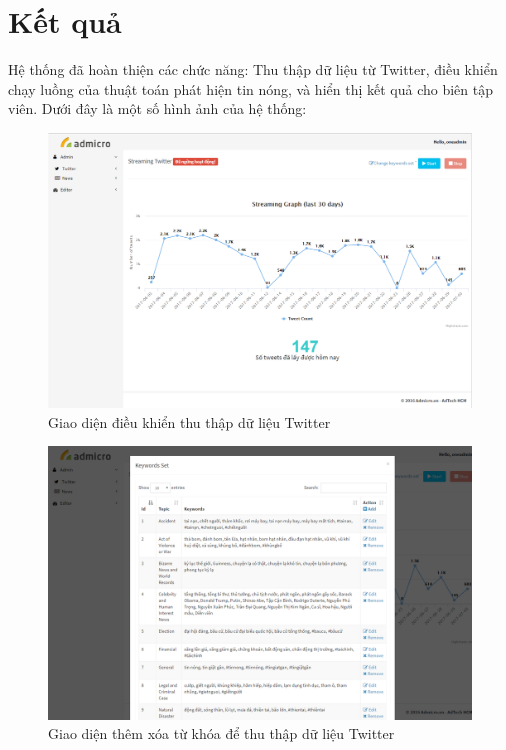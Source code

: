 \section{Kết quả}
Hệ thống đã hoàn thiện các chức năng: Thu thập dữ liệu từ Twitter, điều khiển chạy luồng của thuật toán phát hiện tin nóng, và hiển thị kết quả cho biên tập viên. Dưới đây là một số hình ảnh của hệ thống:

\begin{figure}[H]
	\centering
	\includegraphics[width=1\linewidth]{Chapter3/Chapter3Figs/StreamingNonwide}
	\caption{Giao diện điều khiển thu thập dữ liệu Twitter}
	\label{fig:streaming}
\end{figure}

\begin{figure}[H]
	\centering
	\includegraphics[width=0.96\linewidth]{Chapter3/Chapter3Figs/StreamingKeywords}
	\caption{Giao diện thêm xóa từ khóa để thu thập dữ liệu Twitter}
	\label{fig:streamingkeywords}
\end{figure}

